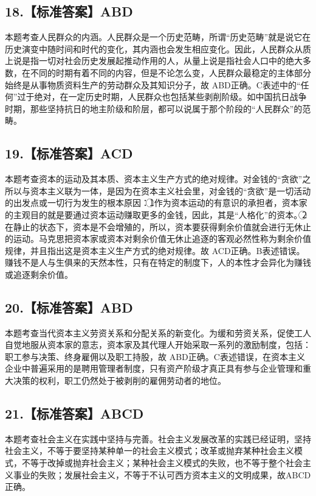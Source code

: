 \documentclass[UTF8,11pt]{ctexart}
\begin{document}
\subsection*{18.【标准答案】ABD}

本题考查人民群众的内涵。人民群众是一个历史范畴，所谓“历史范畴”就是说它在历史演变中随时间和时代的变化，其内涵也会发生相应变化。因此，人民群众从质上说是指一切对社会历史发展起推动作用的人，从量上说是指社会人口中的绝大多数，在不同的时期有着不同的内容，但是不论怎么变，人民群众最稳定的主体部分始终是从事物质资料生产的劳动群众及其知识分子，故 ABD正确。C表述中的“任何”过于绝对，在一定历史时期，人民群众也包括某些剥削阶级。如中国抗日战争时期，那些坚持抗日的地主阶级和阶层，都可以说属于那个阶段的“人民群众”的范畴。


\subsection*{19.【标准答案】ACD}

本题考查资本的运动及其本质、资本主义生产方式的绝对规律。对金钱的“贪欲”之所以与资本主义联为一体，是因为在资本主义社会里，对金钱的“贪欲”是一切活动的出发点或一切行为发生的根本原因：\textcircled{1}作为资本运动的有意识的承担者，资本家的主观目的就是要通过资本运动赚取更多的金钱，因此，其是“人格化”的资本。\textcircled{2}在静止的状态下，资本是不会增殖的，所以，资本要获得剩余价值就会进行无休止的运动。马克思把资本家或资本对剩余价值无休止追逐的客观必然性称为剩余价值规律，并且指出这是资本主义生产方式的绝对规律。故 ACD正确。B表述错误。赚钱不是人与生俱来的天然本性，只有在特定的制度下，人的本性才会异化为赚钱或追逐剩余价值。


\subsection*{20.【标准答案】ABD}

本题考查当代资本主义劳资关系和分配关系的新变化。为缓和劳资关系，促使工人自觉地服从资本家的意志，资本家及其代理人开始采取一系列的激励制度，包括：职工参与决策、终身雇佣以及职工持股，故 ABD正确。C表述错误，在资本主义企业中普遍采用的是聘用管理者制度，只有资产阶级才真正具有参与企业管理和重大决策的权利，职工仍然处于被剥削的雇佣劳动者的地位。


\subsection*{21.【标准答案】ABCD}

本题考查社会主义在实践中坚持与完善。社会主义发展改革的实践已经证明，坚持社会主义，不等于要坚持某种单一的社会主义模式；改革或抛弃某种社会主义模式，不等于改掉或抛弃社会主义；某种社会主义模式的失败，也不等于整个社会主义事业的失败；发展社会主义，不等于不认可西方资本主义的文明成果，故ABCD正确。
\end{document}
